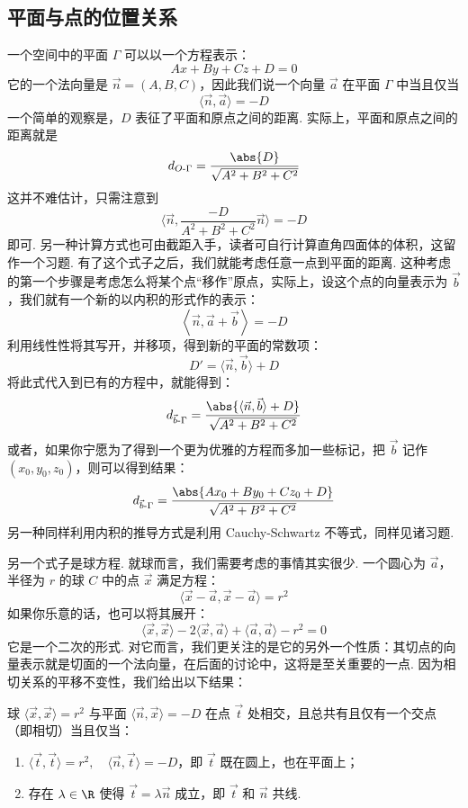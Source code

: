 \subsection{平面与点的位置关系}
一个空间中的平面 $\Gamma$ 可以以一个方程表示：
\[
A x + B y + C z + D = 0
\]
它的一个法向量是 $\vec{n} = (A, B, C)$，因此我们说一个向量 $\vec{a}$ 在平面 $\Gamma$ 中当且仅当
\[
\langle \vec{n}, \vec{a} \rangle = -D
\]
一个简单的观察是，$D$ 表征了平面和原点之间的距离. 实际上，平面和原点之间的距离就是
\[
d_{O\text{-}\Gamma} = \frac{\abs{D}}{\sqrt{A^2 + B^2 + C^2}}
\]
这并不难估计，只需注意到
\[
\langle \vec{n}, \frac{-D}{A^2 + B^2 + C^2}\vec{n} \rangle = -D
\]
即可. 另一种计算方式也可由截距入手，读者可自行计算直角四面体的体积，这留作一个习题. 有了这个式子之后，我们就能考虑任意一点到平面的距离. 这种考虑的第一个步骤是考虑怎么将某个点``移作''原点，实际上，设这个点的向量表示为 $\vec{b}$，我们就有一个新的以内积的形式作的表示：
\[
\left\langle \vec{n}, \vec{a} + \vec{b} \right\rangle = -D
\]
利用线性性将其写开，并移项，得到新的平面的常数项：
\[
D' = \langle \vec{n}, \vec{b} \rangle + D
\]
将此式代入到已有的方程中，就能得到：
\[
d_{\vec{b}\text{-}\Gamma} = \frac{\abs{\langle \vec{n}, \vec{b} \rangle + D}}{\sqrt{A^2 + B^2 + C^2}}
\]
或者，如果你宁愿为了得到一个更为优雅的方程而多加一些标记，把 $\vec{b}$ 记作 $(x_0, y_0, z_0)$，则可以得到结果：
\[
d_{\vec{b}\text{-}\Gamma} = \frac{\abs{A x_0 + B y_0 + C z_0 + D}}{\sqrt{A^2 + B^2 + C^2}}
\]
另一种同样利用内积的推导方式是利用 Cauchy-Schwartz 不等式，同样见诸习题.

另一个式子是球方程. 就球而言，我们需要考虑的事情其实很少. 一个圆心为 $\vec{a}$，半径为 $r$ 的球 $C$ 中的点 $\vec{x}$ 满足方程：
\[
\langle \vec{x} - \vec{a}, \vec{x} - \vec{a} \rangle = r^2
\]
如果你乐意的话，也可以将其展开：
\[
\langle \vec{x}, \vec{x} \rangle - 2 \langle \vec{x}, \vec{a} \rangle + \langle \vec{a}, \vec{a} \rangle - r^2 = 0
\]
它是一个二次的形式. 对它而言，我们更关注的是它的另外一个性质：其切点的向量表示就是切面的一个法向量，在后面的讨论中，这将是至关重要的一点. 因为相切关系的平移不变性，我们给出以下结果：

\begin{theorem}{}{}
球 $\langle \vec{x}, \vec{x} \rangle = r^2$ 与平面 $\langle \vec{n}, \vec{x} \rangle = -D$ 在点 $\vec{t}$ 处相交，且总共有且仅有一个交点（即相切）当且仅当：
\begin{enumerate}
    \item $\langle \vec{t}, \vec{t} \rangle = r^2, \quad \langle \vec{n}, \vec{t} \rangle = -D$，即 $\vec{t}$ 既在圆上，也在平面上；
    \item 存在 $\lambda \in \R$ 使得 $\vec{t} = \lambda \vec{n}$ 成立，即 $\vec{t}$ 和 $\vec{n}$ 共线.
\end{enumerate}
\end{theorem}

